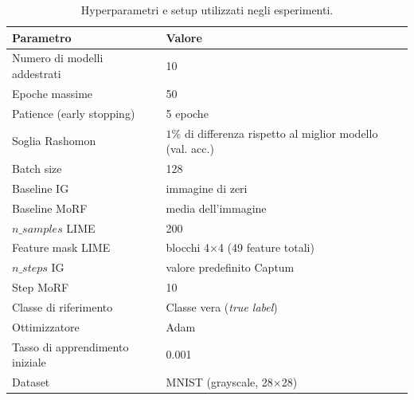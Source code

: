 \documentclass{article}
\begin{document}
\begin{table}[H]
      \centering
      \renewcommand{\arraystretch}{1.2}
      \begin{tabular}{ll}
            \hline
            \textbf{Parametro}              & \textbf{Valore}                                             \\
            \hline
            Numero di modelli addestrati    & 10                                                          \\
            Epoche massime                  & 50                                                          \\
            Patience (early stopping)       & 5 epoche                                                    \\
            Soglia Rashomon                 & $1\%$ di differenza rispetto al miglior modello (val. acc.) \\
            Batch size                      & 128                                                         \\
            Baseline IG                     & immagine di zeri                                            \\
            Baseline MoRF                   & media dell’immagine                                         \\
            $n\_samples$ LIME               & 200                                                         \\
            Feature mask LIME               & blocchi 4×4 (49 feature totali)                             \\
            $n\_steps$ IG                   & valore predefinito Captum                                   \\
            Step MoRF                       & 10                                                          \\
            Classe di riferimento           & Classe vera (\textit{true label})                           \\
            Ottimizzatore                   & Adam                                                        \\
            Tasso di apprendimento iniziale & 0.001                                                       \\
            Dataset                         & MNIST (grayscale, 28×28)                                    \\
            \hline
      \end{tabular}
      \caption{Hyperparametri e setup utilizzati negli esperimenti.}
      \label{tab:hyperparams}
\end{table}
\end{document}
